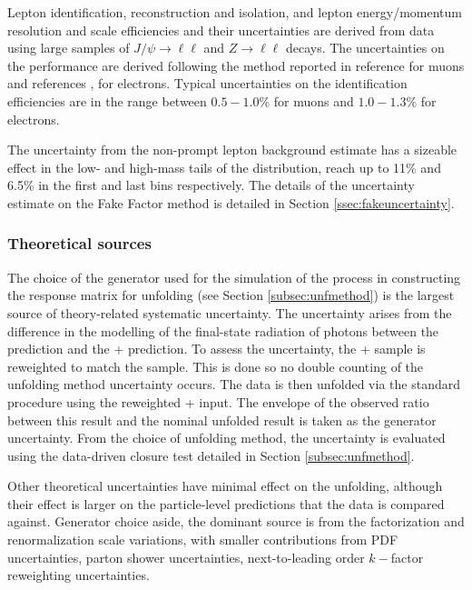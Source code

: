 Lepton identification, reconstruction and isolation, and lepton energy/momentum resolution and scale efficiencies and their uncertainties are derived from data using large samples of $J/\psi\rightarrow\ell\ell$ and $Z\rightarrow\ell\ell$ decays. The uncertainties on the performance are derived following the method reported in reference \cite{ATLAS_muon_reco_2016} for muons and references \cite{ATLAS_electron_efficiency_2015-2017}, \cite{ATLAS_electron_efficiency_2015-2016} for electrons. Typical uncertainties on the identification efficiencies are in the range between $0.5−1.0\%$ for muons and $1.0−1.3\%$ for electrons. 

The uncertainty from the non-prompt lepton background estimate has a sizeable effect in the low- and high-mass tails of the \mFourL distribution, reach up to 11\% and 6.5\% in the first and last bins respectively. The details of the uncertainty estimate on the Fake Factor method is detailed in Section \ref{ssec:fakeuncertainty}.

\subsubsection{Theoretical sources}
The choice of the generator used for the simulation of the \qqFourL{} process in constructing the response matrix for unfolding (see Section \ref{subsec:unfmethod}) is the largest source of theory-related systematic uncertainty. The uncertainty arises from the difference in the modelling of the final-state radiation of photons between the \SHERPA{} prediction and the \POWHEG{} + \pythia{} prediction. To assess the uncertainty, the \POWHEG{} + \pythia{} sample is reweighted to match the \SHERPA{} sample. This is done so no double counting of the unfolding method uncertainty occurs. The data is then unfolded via the standard procedure using the reweighted \POWHEG{} + \pythia{} input. The envelope of the observed ratio between this result and the nominal unfolded result is taken as the generator uncertainty. From the choice of unfolding method, the uncertainty is evaluated using the data-driven closure test detailed in Section \ref{subsec:unfmethod}. 

Other theoretical uncertainties have minimal effect on the unfolding, although their effect is larger on the particle-level predictions that the data is compared against. Generator choice aside, the dominant source is from the factorization and renormalization scale variations, with smaller contributions from PDF uncertainties, parton shower uncertainties, next-to-leading order $k-$factor reweighting uncertainties. 

